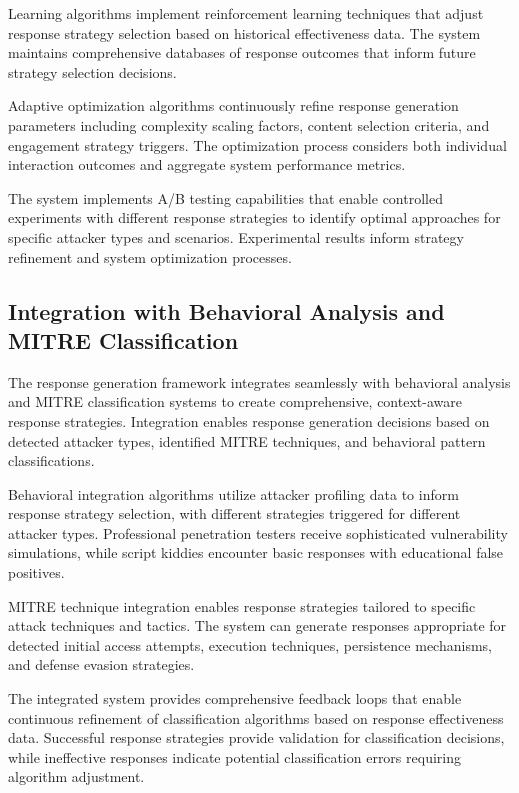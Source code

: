 Learning algorithms implement reinforcement learning techniques that adjust response strategy selection based on historical effectiveness data. The system maintains comprehensive databases of response outcomes that inform future strategy selection decisions.

Adaptive optimization algorithms continuously refine response generation parameters including complexity scaling factors, content selection criteria, and engagement strategy triggers. The optimization process considers both individual interaction outcomes and aggregate system performance metrics.

The system implements A/B testing capabilities that enable controlled experiments with different response strategies to identify optimal approaches for specific attacker types and scenarios. Experimental results inform strategy refinement and system optimization processes.

\subsection{Integration with Behavioral Analysis and MITRE Classification}

The response generation framework integrates seamlessly with behavioral analysis and MITRE classification systems to create comprehensive, context-aware response strategies. Integration enables response generation decisions based on detected attacker types, identified MITRE techniques, and behavioral pattern classifications.

Behavioral integration algorithms utilize attacker profiling data to inform response strategy selection, with different strategies triggered for different attacker types. Professional penetration testers receive sophisticated vulnerability simulations, while script kiddies encounter basic responses with educational false positives.

MITRE technique integration enables response strategies tailored to specific attack techniques and tactics. The system can generate responses appropriate for detected initial access attempts, execution techniques, persistence mechanisms, and defense evasion strategies.

The integrated system provides comprehensive feedback loops that enable continuous refinement of classification algorithms based on response effectiveness data. Successful response strategies provide validation for classification decisions, while ineffective responses indicate potential classification errors requiring algorithm adjustment.

